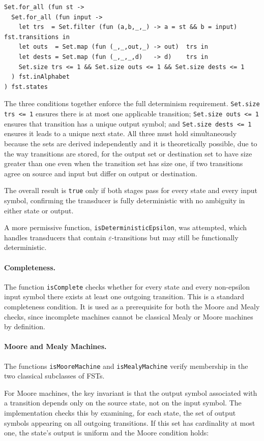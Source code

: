 \begin{verbatim}
Set.for_all (fun st ->
  Set.for_all (fun input ->
    let trs  = Set.filter (fun (a,b,_,_) -> a = st && b = input) fst.transitions in
    let outs  = Set.map (fun (_,_,out,_) -> out)  trs in
    let dests = Set.map (fun (_,_,_,d)   -> d)    trs in
    Set.size trs <= 1 && Set.size outs <= 1 && Set.size dests <= 1
  ) fst.inAlphabet
) fst.states
\end{verbatim}

The three conditions together enforce the full determinism requirement. \texttt{Set.size trs <= 1} ensures there is 
at most one applicable transition; \texttt{Set.size outs <= 1} ensures that transition has a unique output symbol; 
and \texttt{Set.size dests <= 1} ensures it leads to a unique next state. All three must hold simultaneously because 
the sets are derived independently and it is theoretically possible, due to the way transitions are stored, for 
the output set or destination set to have size greater than one even when the transition set has size one, if two 
transitions agree on source and input but differ on output or destination.

The overall result is \texttt{true} only if both stages pass for every state and every input symbol, 
confirming the transducer is fully deterministic with no ambiguity in either state or output.

A more permissive function, \texttt{isDeterministicEpsilon}, was attempted, which handles transducers that contain 
$\varepsilon$-transitions but may still be functionally deterministic.

\paragraph{Completeness.}
The function \texttt{isComplete} checks whether for every state and every non-epsilon input symbol there exists at least one 
outgoing transition. This is a standard completeness condition. It is used as a prerequisite for both the Moore and Mealy checks, 
since incomplete machines cannot be classical Mealy or Moore machines by definition.

\paragraph{Moore and Mealy Machines.}
The functions \texttt{isMooreMachine} and \texttt{isMealyMachine} verify membership in the two classical subclasses of FSTs.

For Moore machines, the key invariant is that the output symbol associated with a transition depends only on the source state, 
not on the input symbol. The implementation checks this by examining, for each state, the set of output symbols appearing on 
all outgoing transitions. If this set has cardinality at most one, the state's output is uniform and the Moore condition holds:

